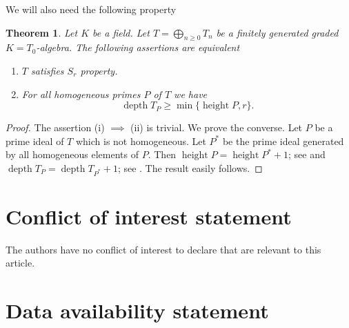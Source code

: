 \documentclass{amsart}
\newcommand{\depth}{\operatorname{depth}}
\newcommand{\height}{\operatorname{height}}
\theoremstyle{plain}
\newtheorem{theorem}{Theorem}[section]
\theoremstyle{definition}
\theoremstyle{remark}
\begin{document}
We will also need the following property
\begin{theorem}\label{hom-sr}
 Let $K$ be a field. Let $T= \bigoplus_{n \geq 0}T_n$ be a finitely generated graded $K = T_0$-algebra. The following assertions are equivalent
\begin{enumerate}[\rm (i)]
\item $T$ satisfies $S_r$ property.
\item For all homogeneous primes $P$ of $T$ we have
$$ \depth T_P \geq \min\{\height P, r \}.$$
\end{enumerate}
\end{theorem}
\begin{proof}
The assertion (i) $\implies$ (ii) is trivial.  We prove the converse. Let $P$ be a prime ideal of $T$ which is not homogeneous.  Let $P^*$ be the prime ideal generated  by  all homogeneous elements of $P$. Then $\height P = \height P^* + 1$; see \cite[1.5.8]{BH} and $\depth T_P = \depth T_{P^*} + 1$; see \cite[1.5.9]{BH}. The result easily follows.
\end{proof}

\medskip

\section{Conflict of interest statement}
The authors have no conflict of interest to declare that are relevant to this article.

\section{Data availability statement}
\end{document}
